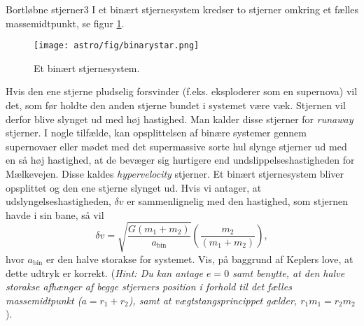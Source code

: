 \begin{opgave}{Bortløbne stjerner}{3}
I et binært stjernesystem kredser to stjerner omkring et fælles massemidtpunkt, se figur \ref{fig:binary}.

\begin{figure}[h]
	\centering
	\texttt{[image: astro/fig/binarystar.png]}
	\caption{Et binært stjernesystem.}
	\label{fig:binary}
\end{figure}

Hvis den ene stjerne pludselig forsvinder (f.eks. eksploderer som en supernova) vil det, som før holdte den anden stjerne bundet i systemet være væk. Stjernen vil derfor blive slynget ud med høj hastighed. Man kalder disse stjerner for \emph{runaway} stjerner. I nogle tilfælde, kan opsplittelsen af binære systemer gennem supernovaer eller mødet med det supermassive sorte hul slynge stjerner ud med en så høj hastighed, at de bevæger sig hurtigere end undslippelseshastigheden for Mælkevejen. Disse kaldes \emph{hypervelocity} stjerner.
	\opg Et binært stjernesystem bliver opsplittet og den ene stjerne slynget ud. Hvis vi antager, at udslyngelseshastigheden, $\delta v$ er sammenlignelig med den hastighed, som stjernen havde i sin bane, så vil
	\begin{equation}
	\delta v = \sqrt{\frac{G (m_1+m_2)}{a_\text{bin}}}\left(\frac{m_2}{(m_1+m_2)}\right),
	\end{equation}
	hvor $a_\text{bin}$ er den halve storakse for systemet. Vis, på baggrund af Keplers love, at dette udtryk er korrekt. (\emph{Hint: Du kan antage $e=0$ samt benytte, at den halve storakse afhænger af begge stjerners position i forhold til det fælles massemidtpunkt ($a=r_1+r_2$), samt at vægtstangsprincippet gælder, $r_1m_1=r_2m_2$}).
\end{opgave}

